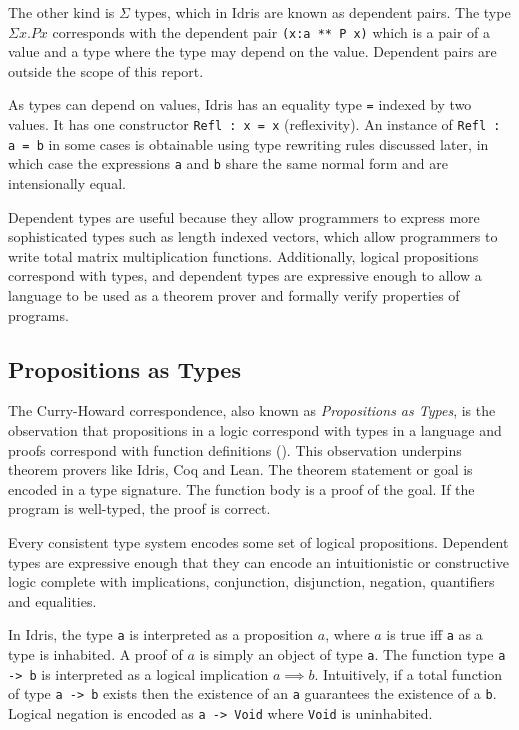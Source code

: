 \documentclass[]{report}
\begin{document}
The other kind is $\Sigma$ types, which in Idris are known as dependent pairs. The type $\Sigma x.Px$ corresponds with the dependent pair \texttt{(x:a ** P x)} which is a pair of a value and a type where the type may depend on the value. Dependent pairs are outside the scope of this report.

As types can depend on values, Idris has an equality type \texttt{=} indexed by two values. It has one constructor \texttt{Refl : x = x} (reflexivity). An instance of \texttt{Refl : a = b} in some cases is obtainable using type rewriting rules discussed later, in which case the expressions \texttt{a} and \texttt{b} share the same normal form and are intensionally equal.

Dependent types are useful because they allow programmers to express more sophisticated types such as length indexed vectors, which allow programmers to write total matrix multiplication functions. Additionally, logical propositions correspond with types, and dependent types are expressive enough to allow a language to be used as a theorem prover and formally verify properties of programs.

\subsection{Propositions as Types}

The Curry-Howard correspondence, also known as \textit{Propositions as Types}, is the observation that propositions in a logic correspond with types in a language and proofs correspond with function definitions (\cite{wadler2015propositions}). This observation underpins theorem provers like Idris, Coq and Lean. The theorem statement or goal is encoded in a type signature. The function body is a proof of the goal. If the program is well-typed, the proof is correct.

Every consistent type system encodes some set of logical propositions. Dependent types are expressive enough that they can encode an intuitionistic or constructive logic complete with implications, conjunction, disjunction, negation, quantifiers and equalities.

In Idris, the type \texttt{a} is interpreted as a proposition $a$, where $a$ is true iff \texttt{a} as a type is inhabited. A proof of $a$ is simply an object of type \texttt{a}. The function type \texttt{a -> b} is interpreted as a logical implication $a\implies b$. Intuitively, if a total function of type \texttt{a -> b} exists then the existence of an \texttt{a} guarantees the existence of a \texttt{b}. Logical negation is encoded as \texttt{a -> Void} where \texttt{Void} is uninhabited.
\end{document}
